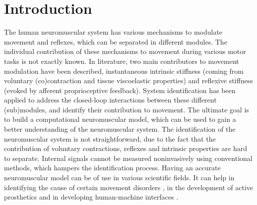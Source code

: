 \chapter{Introduction}

The human neuromuscular system has various mechanisms to modulate movement and reflexes, which can be separated in different modules. The individual contribution of these mechanisms to movement during various motor tasks is not exactly known. In literature, two main contributors to movement modulation have been described, instantaneous intrinsic stiffness (coming from voluntary (co)contraction and tissue viscoelastic properties) and reflexive stiffness (evoked by afferent proprioceptive feedback). System identification has been applied to address the closed-loop interactions between these different (sub)modules, and identify their contribution to movement. The ultimate goal is to build a computational neuromuscular model, which can be used to gain a better understanding of the neuromuscular system. The identification of the neuromuscular system is not straightforward, due to the fact that the contribution of voluntary contractions, reflexes and intrinsic properties are hard to separate. Internal signals cannot be measured noninvasively using conventional methods, which hampers the identification process. Having an accurate neuromuscular model can be of use in various scientific fields. It can help in identifying the cause of certain movement disorders \cite{meskers_neurocontrol_2015}, in the development of active prosthetics \cite{eilenberg_control_2010, markowitz_speed_2011, eilenberg_development_2018} and in developing human-machine interfaces \cite{hosseini_neuromuscular_2010}. 

